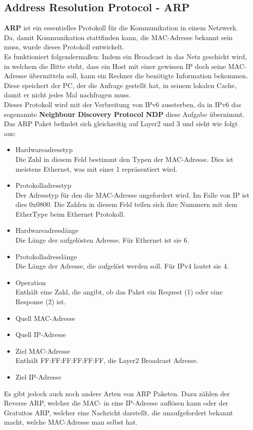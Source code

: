 \documentclass[12pt,a4paper]{report}
\begin{document}
\begin{onehalfspace}
\subsection{Address Resolution Protocol - ARP}\label{ssec:arp}
\textbf{ARP} ist ein essentielles Protokoll für die Kommunikation in einem Netzwerk. Da, damit Kommunikation stattfinden kann, die MAC-Adresse bekannt sein muss, wurde dieses Protokoll entwickelt.\\
Es funktioniert folgendermaßen: Indem ein Broadcast in das Netz geschickt wird, in welchem die Bitte steht, dass ein Host mit einer gewissen IP doch seine MAC-Adresse übermitteln soll, kann ein Rechner die benötigte Information bekommen. Diese speichert der PC, der die Anfrage gestellt hat, in seinem lokalen Cache, damit er nicht jedes Mal nachfragen muss.\\
Dieses Protokoll wird mit der Verbreitung von IPv6 aussterben, da in IPv6 das sogenannte \textbf{Neighbour Discovery Protocol NDP} diese Aufgabe übernimmt.\\

Das ARP Paket befindet sich gleichzeitig auf Layer2 und 3 und sieht wie folgt aus:\\
\begin{itemize}
\item Hardwareadresstyp\\
Die Zahl in diesem Feld bestimmt den Typen der MAC-Adresse. Dies ist meistens Ethernet, was mit einer 1 repräsentiert wird.
\item Protokolladresstyp\\
Der Adresstyp für den die MAC-Adresse angefordert wird. Im Falle von IP ist dies 0x0800. Die Zahlen in diesem Feld teilen sich ihre Nummern mit dem EtherType beim Ethernet Protokoll.
\item Hardwareadresslänge\\
Die Länge der aufgelösten Adresse. Für Ethernet ist sie 6.
\item Protokolladresslänge\\
Die Länge der Adresse, die aufgelöst werden soll. Für IPv4 lautet sie 4.
\item Operation\\
Enthält eine Zahl, die angibt, ob das Paket ein Request (1) oder eine Response (2) ist.
\item Quell MAC-Adresse
\item Quell IP-Adresse
\item Ziel MAC-Adresse\\
Enthält FF:FF:FF:FF:FF:FF, die Layer2 Broadcast Adresse.
\item Ziel IP-Adresse
\end{itemize}
Es gibt jedoch auch noch andere Arten von ARP Paketen. Dazu zählen der Reverse ARP, welcher die MAC- in eine IP-Adresse auflösen kann oder der Gratuitos ARP, welcher eine Nachricht darstellt, die unaufgefordert bekannt macht, welche MAC-Adresse man selbst hat.

\end{onehalfspace}
\end{document}
